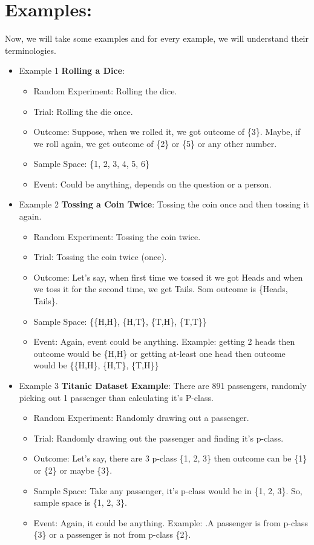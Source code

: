 \documentclass{article}
\begin{document}
\section*{Examples:}
Now, we will take some examples and for every example, we will understand their terminologies.
\begin{itemize}
    \item Example 1 \textbf{Rolling a Dice}: 
    \begin{itemize}
        \item Random Experiment: Rolling the dice.
        \item Trial: Rolling the die once. 
        \item Outcome: Suppose, when we rolled it, we got outcome of \{3\}. Maybe, if we roll again, we get outcome of \{2\} or \{5\} or any other number.
        \item Sample Space: \{1, 2, 3, 4, 5, 6\}
        \item Event: Could be anything, depends on the question or a person.
    \end{itemize}
    \item Example 2 \textbf{Tossing a Coin Twice}: Tossing the coin once and then tossing it again.
    \begin{itemize}
        \item Random Experiment: Tossing the coin twice.
        \item Trial: Tossing the coin twice (once).
        \item Outcome: Let's say, when first time we tossed it we got Heads and when we toss it for the second time, we get Tails. Som outcome is \{Heads, Tails\}.
        \item Sample Space: \{\{H,H\}, \{H,T\}, \{T,H\}, \{T,T\}\}
        \item Event: Again, event could be anything. Example: getting 2 heads then outcome would be \{H,H\} or getting at-least one head then outcome would be \{\{H,H\}, \{H,T\}, \{T,H\}\}
    \end{itemize}
    \newpage
    \item Example 3 \textbf{Titanic Dataset Example}: There are 891 passengers, randomly picking out 1 passenger than calculating it's P-class.
    \begin{itemize}
        \item Random Experiment: Randomly drawing out a passenger.
        \item Trial: Randomly drawing out the passenger and finding it's p-class.
        \item Outcome: Let's say, there are 3 p-class \{1, 2, 3\} then outcome can be \{1\} or \{2\} or maybe \{3\}.
        \item Sample Space: Take any passenger, it's p-class would be in \{1, 2, 3\}. So, sample space is \{1, 2, 3\}.
        \item Event: Again, it could be anything. Example: .A passenger is from p-class \{3\} or a passenger is not from p-class \{2\}.
    \end{itemize}
\end{itemize}
\end{document}

